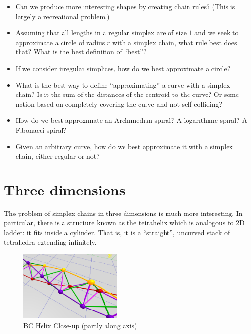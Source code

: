\documentclass[11pt]{article}
\begin{document}
\begin{itemize}
\item Can we produce more interesting shapes by creating chain rules? (This is largely a recreational problem.)
\item Assuming that all lengths in a regular simplex are of size $1$ and we seek to approximate a circle of radius $r$ with a simplex chain,
  what rule best does that?  What is the best definition of ``best''?
\item If we consider irregular simplices, how do we best approximate a circle?
\item What is the best way to define ``approximating'' a curve with a simplex chain? Is it the sum of the distances of the centroid to the curve?
  Or some notion based on completely covering the curve and not self-colliding?
\item How do we best approximate an Archimedian spiral? A logarithmic spiral? A Fibonacci spiral?
\item Given an arbitrary curve, how do we best approximate it with a simplex chain, either regular or not?
\end{itemize}

\section{Three dimensions}

The problem of simplex chains in three dimensions is much more interesting. In particular, there is a structure known as the
tetrahelix which is analogous to 2D ladder: it fits inside a cylinder. That is, it is a ``straight'', uncurved stack
of tetrahedra extending infinitely.



\begin{figure}
  \centering
     \includegraphics[width=0.45\textwidth]{figures/BCHelixCloseUp.png}
     \caption{BC Helix Close-up (partly along axis)}
  \label{fig:closeup}     
\end{figure}
\end{document}
